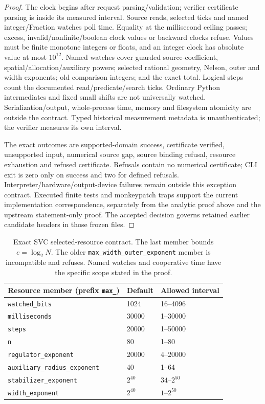 \begin{proof}
The clock begins after request parsing/validation; verifier certificate
parsing is inside its measured interval. Source reads, selected ticks
and named integer/Fraction watches poll time. Equality at the millisecond
ceiling passes; excess, invalid/nonfinite/boolean clock values or
backward clocks refuse. Values must be finite monotone integers or floats,
and an integer clock has absolute value at most $10^{12}$.
Named watches cover guarded source-coefficient,
spatial/allocation/auxiliary powers; selected rational geometry, Nelson,
outer and width exponents; old comparison integers; and the exact total.
Logical steps count the documented read/predicate/search ticks. Ordinary
Python intermediates and fixed small shifts are not universally watched.
Serialization/output, whole-process time, memory and filesystem atomicity
are outside the contract. Typed historical measurement metadata is
unauthenticated; the verifier measures its own interval.

The exact outcomes are supported-domain success, certificate verified,
unsupported input, numerical source gap, source binding refusal, resource
exhaustion and refused certificate. Refusals contain no numerical
certificate; CLI exit is zero only on success and two for defined
refusals. Interpreter/hardware/output-device failures remain outside this
exception contract. Executed finite tests and monkeypatch traps support
the current implementation correspondence, separately from the analytic
proof above and the upstream statement-only proof. The accepted decision
governs retained earlier candidate headers in those frozen files.
\end{proof}

\begin{table}[htbp]
\centering\small
\begin{tabular}{lll}\toprule
Resource member (prefix \texttt{max\_})&Default&Allowed interval\\\midrule
\texttt{watched\_bits}&1024&16--4096\\
\texttt{milliseconds}&30000&1--30000\\
\texttt{steps}&20000&1--50000\\
\texttt{n}&80&1--80\\
\texttt{regulator\_exponent}&20000&4--20000\\
\texttt{auxiliary\_radius\_exponent}&40&1--64\\
\texttt{stabilizer\_exponent}&$2^{40}$&$34$--$2^{50}$\\
\texttt{width\_exponent}&$2^{40}$&$1$--$2^{50}$\\\bottomrule
\end{tabular}
\caption{Exact SVC selected-resource contract. The last member bounds
$e=\log_2N$. The older \texttt{max\_width\_outer\_exponent} member is
incompatible and refuses. Named watches and cooperative time have the
specific scope stated in the proof.}\label{sva:resources}
\end{table}

